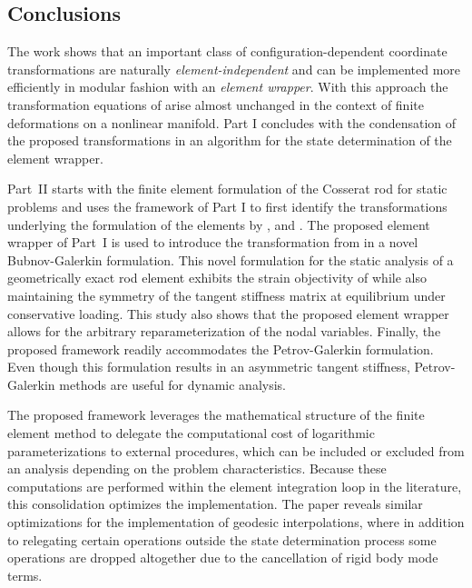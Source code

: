 
\subsection{Conclusions}

The work shows that an important class of configuration-dependent coordinate transformations are naturally \emph{element-independent} and can be implemented more efficiently in modular fashion %
with an \emph{element wrapper}.
With this approach the transformation equations of \cite{nour-omid1991finite}
arise almost unchanged in the context of finite deformations on a nonlinear manifold.
Part I concludes with the condensation of the proposed transformations in an algorithm for the state determination of the element wrapper.

Part~II 
starts with
the finite element formulation of 
the %
Cosserat rod for static problems
and uses the framework of Part I %
to first identify the transformations underlying the formulation of
the elements by  \cite{simo1986threedimensional}, \cite{ibrahimbegović1995computational} 
and \cite{jelenić1998interpolation}.
The proposed element wrapper of Part~I is used to 
introduce the transformation from \cite{crisfield1999objectivity} 
in a novel Bubnov-Galerkin formulation.
This novel formulation for the static analysis of a geometrically exact rod element exhibits the strain objectivity of \cite{jelenić1999geometrically} while also maintaining the symmetry of the tangent stiffness matrix at equilibrium under conservative loading.
This study also shows that the proposed element wrapper allows for
the arbitrary reparameterization of the nodal variables.
Finally, the proposed framework readily accommodates the Petrov-Galerkin formulation.
Even though this formulation results in an asymmetric tangent stiffness, Petrov-Galerkin methods are useful for dynamic analysis.

The proposed framework leverages the mathematical structure of the finite element method to delegate the computational cost of logarithmic parameterizations to external procedures, which can be included or excluded from an analysis depending on the problem characteristics.
Because these computations are performed within the element integration loop in the literature, this consolidation optimizes the implementation.
The paper reveals similar optimizations for the implementation of geodesic interpolations, where in addition to relegating certain operations outside the state determination process some operations are dropped altogether due to the cancellation of rigid body mode terms.
